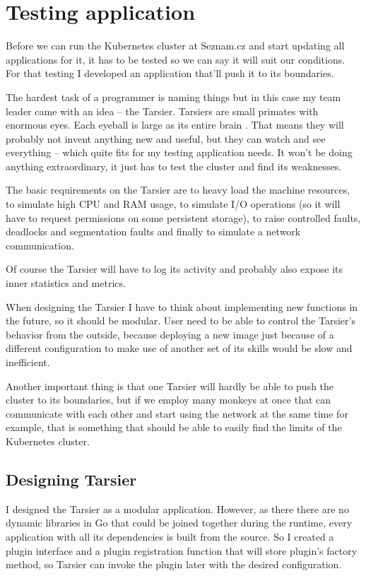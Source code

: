 \chapter{Testing application}

Before we can run the Kubernetes cluster at Seznam.cz and start updating all applications for it, it has to be tested so we can say it will suit our conditions. For that testing I developed an application that’ll push it to its boundaries.

The hardest task of a programmer is naming things \cite{programming-naming} but in this case my team leader came with an idea -- the Tarsier. Tarsiers are small primates with enormous eyes. Each eyeball is large as its entire brain \cite{tarsier}.  That means they will probably not invent anything new and useful, but they can watch and see everything -- which quite fits for my testing application needs. It won’t be doing anything extraordinary, it just has to test the cluster and find its weaknesses.

The basic requirements on the Tarsier are to heavy load the machine resources, to simulate high CPU and RAM usage, to simulate I/O operations (so it will have to request permissions on some persistent storage), to raise controlled faults, deadlocks and segmentation faults and finally to simulate a network communication.

Of course the Tarsier will have to log its activity and probably also expose its inner statistics and metrics.

When designing the Tarsier I have to think about implementing new functions in the future, so it should be modular. User need to be able to control the Tarsier’s behavior from the outside, because deploying a new image just because of a different configuration to make use of another set of its skills would be slow and inefficient.

Another important thing is that one Tarsier will hardly be able to push the cluster to its boundaries, but if we employ many monkeys at once that can communicate with each other and start using the network at the same time for example, that is something that should be able to easily find the limits of the Kubernetes cluster.

\section{Designing Tarsier}

I designed the Tarsier as a modular application. However, as there there are no dynamic libraries in Go that could be joined together during the runtime, every application with all its dependencies is built from the source. So I created a plugin interface and a plugin registration function that will store plugin’s factory method, so Tarsier can invoke the plugin later with the desired configuration.

